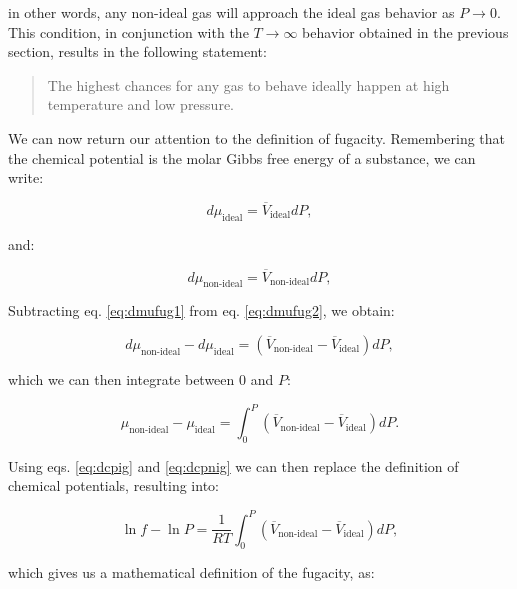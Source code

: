 \documentclass[
  9pt,
]{extbook}
\theoremstyle{definition}
\theoremstyle{definition}
\theoremstyle{definition}
\theoremstyle{remark}
\begin{document}
in other words, any non-ideal gas will approach the ideal gas behavior as \(P\rightarrow 0\). This condition, in conjunction with the \(T\rightarrow \infty\) behavior obtained in the previous section, results in the following statement:

\begin{quote}
The highest chances for any gas to behave ideally happen at high temperature and low pressure.
\end{quote}

We can now return our attention to the definition of fugacity. Remembering that the chemical potential is the molar Gibbs free energy of a substance, we can write:

\begin{equation}
d \mu_{\text{ideal}} = \overline{V}_{\text{ideal}}dP,
\label{eq:dmufug1}
\end{equation}

and:

\begin{equation}
d \mu_{\text{non-ideal}} = \overline{V}_{\text{non-ideal}}dP,
\label{eq:dmufug2}
\end{equation}

Subtracting eq. \eqref{eq:dmufug1} from eq. \eqref{eq:dmufug2}, we obtain:

\begin{equation}
d \mu_{\text{non-ideal}}-d \mu_{\text{ideal}} = \left(\overline{V}_{\text{non-ideal}}-\overline{V}_{\text{ideal}} \right) dP,
\label{eq:dmufug3}
\end{equation}

which we can then integrate between \(0\) and \(P\):

\begin{equation}
\mu_{\text{non-ideal}}-\mu_{\text{ideal}} = \int_0^P \left(\overline{V}_{\text{non-ideal}}-\overline{V}_{\text{ideal}} \right) dP.
\label{eq:dmufug4}
\end{equation}

Using eqs. \eqref{eq:dcpig} and \eqref{eq:dcpnig} we can then replace the definition of chemical potentials, resulting into:

\begin{equation}
\ln f - \ln P = \frac{1}{RT} \int_0^P \left(\overline{V}_{\text{non-ideal}} - \overline{V}_{\text{ideal}} \right) dP,
\label{eq:dmufug5}
\end{equation}

which gives us a mathematical definition of the fugacity, as:
\end{document}
